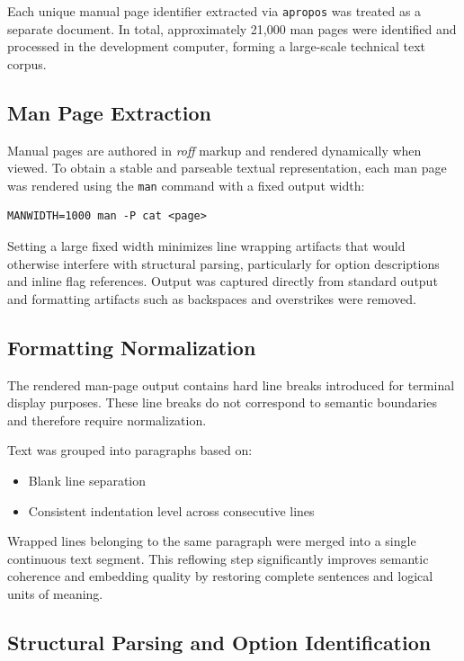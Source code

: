 \documentclass[conference]{IEEEtran}
\begin{document}
Each unique manual page identifier extracted via \texttt{apropos} was treated as a separate document. In total, approximately 21,000 man pages were identified and processed in the development computer, forming a large-scale technical text corpus.

\subsection{Man Page Extraction}

Manual pages are authored in \textit{roff} markup and rendered dynamically when viewed. To obtain a stable and parseable textual representation, each man page was rendered using the \texttt{man} command with a fixed output width:

\begin{verbatim}
MANWIDTH=1000 man -P cat <page>
\end{verbatim}

Setting a large fixed width minimizes line wrapping artifacts that would otherwise interfere with structural parsing, particularly for option descriptions and inline flag references. Output was captured directly from standard output and formatting artifacts such as backspaces and overstrikes were removed.

\subsection{Formatting Normalization}

The rendered man-page output contains hard line breaks introduced for terminal display purposes. These line breaks do not correspond to semantic boundaries and therefore require normalization.

Text was grouped into paragraphs based on:
\begin{itemize}
    \item Blank line separation
    \item Consistent indentation level across consecutive lines
\end{itemize}

Wrapped lines belonging to the same paragraph were merged into a single continuous text segment. This reflowing step significantly improves semantic coherence and embedding quality by restoring complete sentences and logical units of meaning.

\subsection{Structural Parsing and Option Identification}
\end{document}
